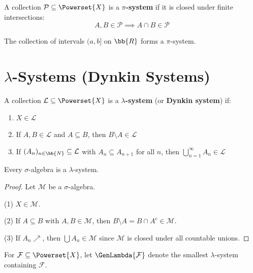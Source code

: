 \begin{definition}[$\pi$-System]
A collection $\mathcal{P} \subseteq \Powerset{X}$ is a \textbf{$\pi$-system} if it is closed under finite intersections:
\[ A, B \in \mathcal{P} \implies A \cap B \in \mathcal{P} \]
\end{definition}

\begin{example}
The collection of intervals $(a, b]$ on $\bb{R}$ forms a $\pi$-system.
\end{example}

\section{$\lambda$-Systems (Dynkin Systems)}

\begin{definition}
A collection $\mathcal{L} \subseteq \Powerset{X}$ is a \textbf{$\lambda$-system} (or \textbf{Dynkin system}) if:
\begin{enumerate}
    \item $X \in \mathcal{L}$
    \item If $A, B \in \mathcal{L}$ and $A \subseteq B$, then $B \setminus A \in \mathcal{L}$
    \item If $(A_n)_{n \in \bb{N}} \subseteq \mathcal{L}$ with $A_n \subseteq A_{n+1}$ for all $n$, then $\bigcup_{n=1}^{\infty} A_n \in \mathcal{L}$
\end{enumerate}
\end{definition}

\begin{proposition}
Every $\sigma$-algebra is a $\lambda$-system.
\end{proposition}

\begin{proof}
Let $\mathcal{M}$ be a $\sigma$-algebra.

(1) $X \in \mathcal{M}$.

(2) If $A \subseteq B$ with $A, B \in \mathcal{M}$, then $B \setminus A = B \cap A^c \in \mathcal{M}$.

(3) If $A_n \nearrow$, then $\bigcup A_n \in \mathcal{M}$ since $\mathcal{M}$ is closed under all countable unions.
\end{proof}

\begin{definition}
For $\mathcal{F} \subseteq \Powerset{X}$, let $\GenLambda{\mathcal{F}}$ denote the smallest $\lambda$-system containing $\mathcal{F}$.
\end{definition}

